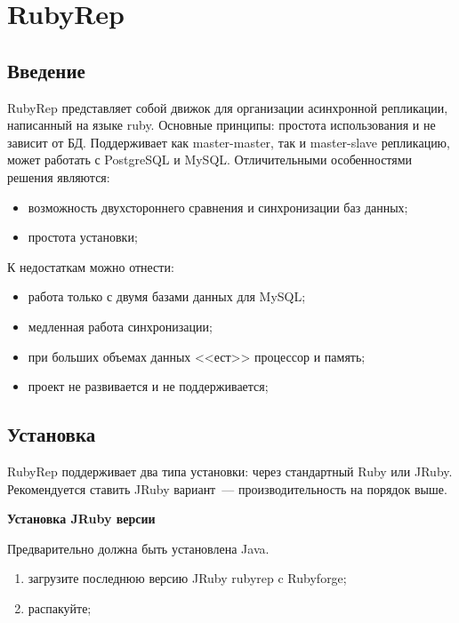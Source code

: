 \section{RubyRep}

\subsection{Введение}

RubyRep представляет собой движок для организации асинхронной репликации, написанный на языке ruby. Основные принципы: простота использования и не зависит от БД. Поддерживает как master-master, так и master-slave репликацию, может работать с PostgreSQL и MySQL. Отличительными особенностями решения являются:

\begin{itemize}
  \item возможность двухстороннего сравнения и синхронизации баз данных;
  \item простота установки;
\end{itemize}

К недостаткам можно отнести:

\begin{itemize}
  \item работа только с двумя базами данных для MySQL;
  \item медленная работа синхронизации;
  \item при больших объемах данных <<ест>> процессор и память;
  \item проект не развивается и не поддерживается;
\end{itemize}


\subsection{Установка}

RubyRep поддерживает два типа установки: через стандартный Ruby или JRuby. Рекомендуется ставить JRuby вариант~--- производительность на порядок выше.

\textbf{Установка JRuby версии}

Предварительно должна быть установлена Java.

\begin{enumerate}
 \item загрузите последнюю версию JRuby rubyrep c Rubyforge;
 \item распакуйте;
\end{enumerate}

